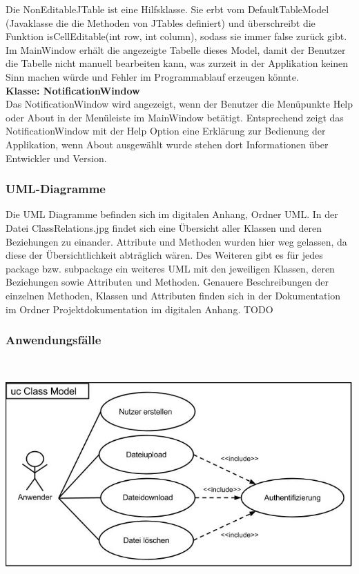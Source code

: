\documentclass[12pt,a4paper,bibliography=totocnumbered,listof=totocnumbered]{scrartcl}
\begin{document}
Die NonEditableJTable ist eine Hilfsklasse. Sie erbt vom DefaultTableModel (Javaklasse die die Methoden von JTables definiert) und überschreibt die Funktion isCellEditable(int row, int column), sodass sie immer false zurück gibt. Im MainWindow erhält die angezeigte Tabelle dieses Model, damit der Benutzer die Tabelle nicht manuell bearbeiten kann, was zurzeit in der Applikation keinen Sinn machen würde und Fehler im Programmablauf erzeugen könnte.\\
\textbf{Klasse: NotificationWindow}\\
Das NotificationWindow wird angezeigt, wenn der Benutzer die Menüpunkte Help oder About in der Menüleiste im MainWindow betätigt. Entsprechend zeigt das NotificationWindow mit der Help Option eine Erklärung zur Bedienung der Applikation, wenn About ausgewählt wurde stehen dort Informationen über Entwickler und Version.


\subsubsection{UML-Diagramme}
Die UML Diagramme befinden sich im digitalen Anhang, Ordner UML. In der Datei ClassRelations.jpg findet sich eine Übersicht aller Klassen und deren Beziehungen zu einander. Attribute und Methoden wurden hier weg gelassen, da diese der Übersichtlichkeit abträglich wären. Des Weiteren gibt es für jedes package bzw. subpackage ein weiteres UML mit den jeweiligen Klassen, deren Beziehungen sowie Attributen und Methoden. Genauere Beschreibungen der einzelnen Methoden, Klassen und Attributen finden sich in der Dokumentation im Ordner Projektdokumentation im digitalen Anhang. TODO

\pagebreak

\subsubsection{Anwendungsfälle}
\vspace{0,5em}
$\;$\\
\begin{minipage}{\linewidth}
	\centering
	\includegraphics[width=0.8\linewidth]{UseCase.jpg}
\end{minipage}
\vspace{0,em}
\end{document}
